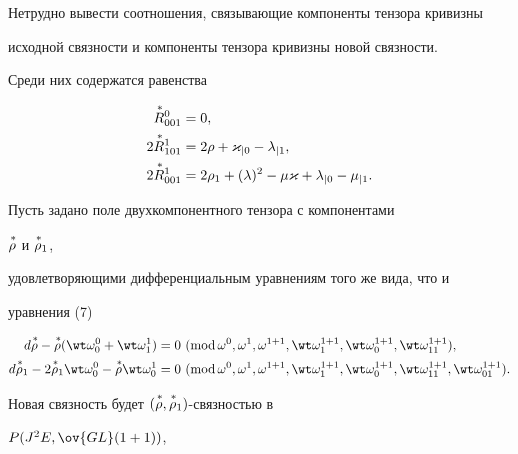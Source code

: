 Нетрудно вывести соотношения, связывающие компоненты тензора кривизны 


исходной связности и компоненты тензора кривизны новой связности. 


Среди них содержатся равенства 


\begin{align*} 


\up{\,*}{R}^0_{001}&=0,\\ 


2\up{\,*}{R}^1_{101}&=2\rho+\varkappa_{|0}-\lambda_{|1},\\ 


2\up{\,*}{R}^1_{001}&=2\rho_1+(\lambda)^2-\mu\varkappa+ 


\lambda_{|0}-\mu_{|1}. 


\end{align*} 


 


Пусть задано поле двухкомпонентного тензора с компонентами 


$\overset{\,*}{\rho}{}$ и $\overset{\,*}{\rho}{}_1$, 


удовлетворяющими дифференциальным уравнениям того же вида, что и 


уравнения (7) 


\begin{equation} 


\begin{split} 


d\up{\,*}{\rho}-\up{\,*}{\rho}(\wt\omega^0_0+\wt\omega^1_1)


&=0\ (\Mod\omega^0,\omega^1,\omega^{1+1},\wt\omega^{1+1}_1, 


\wt\omega^{1+1}_0,\wt\omega^{1+1}_{11}),\\ 


%


d\up{\,*}{\rho}_1-2\up{\,*}{\rho}_1\wt\omega^0_0 


-\up{\,*}{\rho}\wt\omega^1_0 


&=0\ (\Mod\omega^0,\omega^1,\omega^{1+1},\wt\omega^{1+1}_1, 


\wt\omega^{1+1}_0,\wt\omega^{1+1}_{11},\wt\omega^{1+1}_{01}). 


\end{split} 


\end{equation} 


Новая связность будет $(\overset{\,*}{\rho}{},\overset{\,*}{\rho}{}_1)$-связностью в 


$P(J^2 E,\ov{GL}(1+1))$, 



